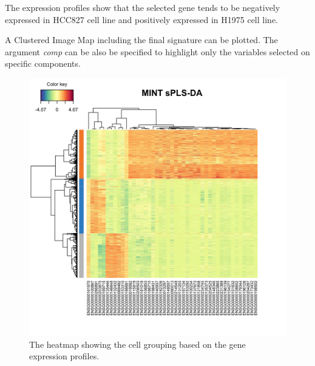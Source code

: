 \documentclass[]{book}
\newenvironment{Shaded}{\begin{snugshade}}{\end{snugshade}}
\newcommand{\CommentTok}[1]{\textcolor[rgb]{0.56,0.35,0.01}{\textit{#1}}}
\newcommand{\DataTypeTok}[1]{\textcolor[rgb]{0.13,0.29,0.53}{#1}}
\newcommand{\DecValTok}[1]{\textcolor[rgb]{0.00,0.00,0.81}{#1}}
\newcommand{\KeywordTok}[1]{\textcolor[rgb]{0.13,0.29,0.53}{\textbf{#1}}}
\newcommand{\NormalTok}[1]{#1}
\newcommand{\OperatorTok}[1]{\textcolor[rgb]{0.81,0.36,0.00}{\textbf{#1}}}
\newcommand{\StringTok}[1]{\textcolor[rgb]{0.31,0.60,0.02}{#1}}
\theoremstyle{definition}
\theoremstyle{definition}
\theoremstyle{definition}
\theoremstyle{remark}
\begin{document}
The expression profiles show that the selected gene tends to be
negatively expressed in HCC827 cell line and positively expressed in
H1975 cell line.

A Clustered Image Map including the final signature can be plotted. The
argument \emph{comp} can be also be specified to highlight only the
variables selected on specific components.

\begin{Shaded}
\end{Shaded}

\begin{figure}[ht]

{\centering \includegraphics[width=0.8\linewidth]{heatmap} 

}

\caption{The heatmap showing the cell grouping based on the gene expression profiles.}\label{fig:unnamed-chunk-39}
\end{figure}
\end{document}
